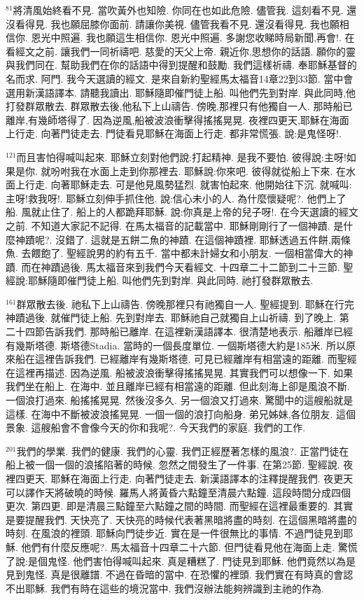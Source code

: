 \documentclass{book}
\begin{document}
$^{81}$將清風始終看不見.
當吹黃外也知險.
你同在也如此危險.
儘管我.
這刻看不見.
還沒看得見.
我也願屈膝你面前.
請讓你美視.
儘管我看不見.
還沒看得見.
我也願相信你.
恩光中照遍.
我也願這生相信你.
恩光中照遍.
多謝您收睇時局新聞,再會!.
在看經文之前.
讓我們一同祈禱吧.
慈愛的天父上帝.
親近你,思想你的話語.
願你的靈與我們同在.
幫助我們在你的話語中得到提醒和鼓勵.
我們這樣祈禱.
奉耶穌基督的名而求.
阿門.
我今天選讀的經文.
是來自新約聖經馬太福音14章22到33節.
當中會選用新漢語譯本.
請聽我讀出.
耶穌隨即催門徒上船.
叫他們先到對岸.
與此同時,他打發群眾散去.
群眾散去後,他私下上山禱告.
傍晚,那裡只有他獨自一人.
那時船已離岸,有幾師塔得了.
因為逆風,船被波浪衝擊得搖搖晃晃.
夜裡四更天,耶穌在海面上行走.
向著門徒走去.
門徒看見耶穌在海面上行走.
都非常慌張.
說:是鬼怪呀!.

$^{121}$而且害怕得喊叫起來.
耶穌立刻對他們說:打起精神.
是我不要怕.
彼得說:主呀!如果是你.
就吩咐我在水面上走到你那裡去.
耶穌說:你來吧.
彼得就從船上下來.
在水面上行走.
向著耶穌走去.
可是他見風勢猛烈.
就害怕起來.
他開始往下沉.
就喊叫:主呀!救我呀!.
耶穌立刻伸手抓住他.
說:信心未小的人.
為什麼懷疑呢?.
他們上了船.
風就止住了.
船上的人都跪拜耶穌.
說:你真是上帝的兒子呀!.
在今天選讀的經文之前.
不知道大家記不記得.
在馬太福音的記載當中.
耶穌剛剛行了一個神蹟.
是什麼神蹟呢?.
沒錯了.
這就是五餅二魚的神蹟.
在這個神蹟裡.
耶穌透過五件餅,兩條魚.
去餵飽了.
聖經說男的約有五千.
當中都未計婦女和小朋友.
一個相當偉大的神蹟.
而在神蹟過後.
馬太福音來到我們今天看經文.
十四章二十二節到二十三節.
聖經說:耶穌隨即催門徒上船.
叫他們先到對岸.
與此同時.
祂打發群眾散去.

$^{161}$群眾散去後.
祂私下上山禱告.
傍晚那裡只有祂獨自一人.
聖經提到.
耶穌在行完神蹟過後.
就催門徒上船.
先到對岸去.
耶穌祂自己就獨自上山祈禱.
到了晚上.
第二十四節告訴我們.
那時船已離岸.
在這裡新漢語譯本.
很清楚地表示.
船離岸已經有幾斯塔德.
斯塔德Stadia.
當時的一個長度單位.
一個斯塔德大約是185米.
所以原來船在這裡告訴我們.
已經離岸有幾斯塔德.
可見已經離岸有相當遠的距離.
而聖經在這裡再描述.
因為逆風.
船被波浪衝擊得搖搖晃晃.
其實我們可以想像一下.
如果我們坐在船上.
在海中.
並且離岸已經有相當遠的距離.
但此刻海上卻是風浪不斷.
一個浪打過來.
船搖搖晃晃.
然後沒多久.
另一個浪又打過來.
驚聞中的這艘船就是這樣.
在海中不斷被波浪搖晃晃.
一個一個的浪打向船身.
弟兄姊妹,各位朋友.
這個景象.
這艘船會不會像今天的你和我呢?.
今天我們的家庭.
我們的工作.

$^{201}$我們的學業.
我們的健康.
我們的心靈.
我們正經歷著怎樣的風浪?.
正當門徒在船上被一個一個的浪搖陷著的時候.
忽然之間發生了一件事.
在第25節.
聖經說.
夜裡四更天.
耶穌在海面上行走.
向著門徒走去.
新漢語譯本的注釋提醒我們.
夜更天可以譯作天將破曉的時候.
羅馬人將黃昏六點鐘至清晨六點鐘.
這段時間分成四個更次.
第四更.
即是清晨三點鐘至六點鐘之間的時間.
而聖經在這裡最重要的.
其實是要提醒我們.
天快亮了.
天快亮的時候代表著黑暗將盡的時刻.
在這個黑暗將盡的時刻.
在風浪的裡頭.
耶穌向門徒步近.
實在是一件很無比的事情.
不過門徒見到耶穌.
他們有什麼反應呢?.
馬太福音十四章二十六節.
但門徒看見他在海面上走.
驚慌了說:是個鬼怪.
他們害怕得喊叫起來.
真是糟糕了.
門徒見到耶穌.
他們竟然以為是見到鬼怪.
真是很離譜.
不過在昏暗的當中.
在恐懼的裡頭.
我們實在有時真的會認不出耶穌.
我們有時在這些的境況當中.
我們沒辦法能夠辨識到主祂的作為.
\end{document}
